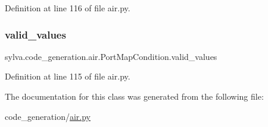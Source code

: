 Definition at line 116 of file air.\+py.

\mbox{\label{classsylva_1_1code__generation_1_1air_1_1_port_map_condition_a98936107f0135352da9608e71fcdf69e}} 
\subsubsection{\texorpdfstring{valid\+\_\+values}{valid\_values}}
{\footnotesize\ttfamily sylva.\+code\+\_\+generation.\+air.\+Port\+Map\+Condition.\+valid\+\_\+values}



Definition at line 115 of file air.\+py.



The documentation for this class was generated from the following file\+:\begin{DoxyCompactItemize}
\item 
code\+\_\+generation/\hyperlink{air_8py}{air.\+py}\end{DoxyCompactItemize}
